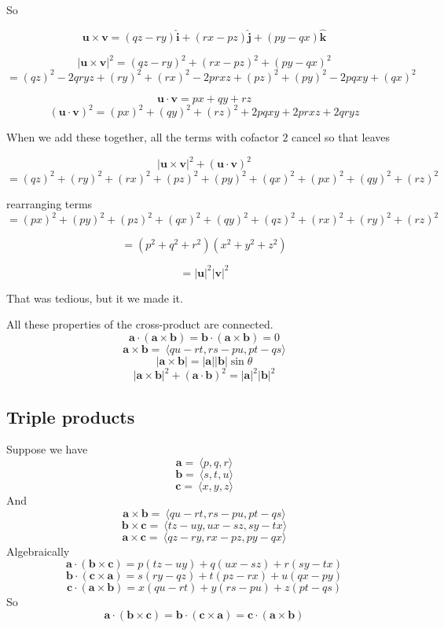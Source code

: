 \documentclass[11pt, oneside]{report}   	%
\begin{document}
So

\[ \mathbf{u} \times \mathbf{v}  = (qz-ry) \hat{\mathbf{i}}  + (rx-pz) \hat{\mathbf{j}} + (py-qx) \hat{\mathbf{k}}\]

\[ |\mathbf{u} \times \mathbf{v}|^2 = (qz-ry)^2 + (rx-pz)^2 + (py-qx)^2 \]
\[ = (qz)^2 - 2qryz + (ry)^2 + (rx)^2 - 2prxz + (pz)^2 + (py)^2 - 2pqxy + (qx)^2 \]


\[ \mathbf{u} \cdot \mathbf{v} = px + qy + rz \]
\[ (\mathbf{u} \cdot \mathbf{v})^2 = (px)^2 + (qy)^2 + (rz)^2 + 2pqxy + 2prxz + 2qryz \]

When we add these together, all the terms with cofactor $2$ cancel so that leaves

\[ | \mathbf{u} \times \mathbf{v} |^2 + (\mathbf{u} \cdot \mathbf{v})^2 \]
\[ =  (qz)^2 + (ry)^2 + (rx)^2 + (pz)^2 + (py)^2 + (qx)^2 + (px)^2 + (qy)^2 + (rz)^2 \]


rearranging terms
\[ = (px)^2 + (py)^2 + (pz)^2 + (qx)^2 + (qy)^2 + (qz)^2 + (rx)^2 +(ry)^2   + (rz)^2 \]

\[ = (p^2 + q^2 + r^2)(x^2 + y^2 + z^2) \]

\[ = |\mathbf{u}|^2 |\mathbf{v}|^2 \]

That was tedious, but it we made it.

All these properties of the cross-product are connected.
\[ \mathbf{a}  \cdot (\mathbf{a} \times \mathbf{b}) = \mathbf{b}  \cdot (\mathbf{a} \times \mathbf{b}) = 0 \]
\[ \mathbf{a} \times \mathbf{b} =  \ \langle qu-rt, rs-pu, pt-qs \rangle \]
\[ |\mathbf{a} \times \mathbf{b}|  = |\mathbf{a}| |\mathbf{b}| \sin \theta \]
\[ | \mathbf{a} \times \mathbf{b} |^2 + (\mathbf{a} \cdot \mathbf{b})^2 = |\mathbf{a}|^2 |\mathbf{b}|^2 \]

\subsection*{Triple products}
Suppose we have
\[\mathbf{a} = \ \langle p,q,r \rangle \]
\[\mathbf{b} = \ \langle s,t,u \rangle \]
\[\mathbf{c} = \ \langle x,y,z \rangle \]
And
\[ \mathbf{a} \times \mathbf{b} =  \ \langle qu-rt, rs-pu, pt-qs \rangle \]
\[ \mathbf{b} \times \mathbf{c} =  \ \langle tz-uy, ux-sz, sy-tx \rangle \]
\[ \mathbf{a} \times \mathbf{c} =  \ \langle qz-ry, rx-pz, py-qx \rangle \]
Algebraically
\[ \mathbf{a} \cdot (\mathbf{b} \times \mathbf{c}) = p(tz-uy) + q(ux-sz) + r(sy-tx)  \]
\[ \mathbf{b} \cdot (\mathbf{c} \times \mathbf{a}) = s(ry-qz) + t(pz-rx) + u(qx-py) \]
\[ \mathbf{c} \cdot (\mathbf{a} \times \mathbf{b}) = x(qu-rt) + y(rs-pu) + z(pt-qs) \]
So
\[ \mathbf{a} \cdot (\mathbf{b} \times \mathbf{c}) = \mathbf{b} \cdot (\mathbf{c} \times \mathbf{a}) = \mathbf{c} \cdot (\mathbf{a} \times \mathbf{b}) \]
\end{document}
